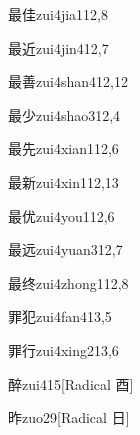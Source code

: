 \begin{entry}{最佳}{zui4jia1}{12,8}
\end{entry}

\begin{entry}{最近}{zui4jin4}{12,7}
\end{entry}

\begin{entry}{最善}{zui4shan4}{12,12}
\end{entry}

\begin{entry}{最少}{zui4shao3}{12,4}
\end{entry}

\begin{entry}{最先}{zui4xian1}{12,6}
\end{entry}

\begin{entry}{最新}{zui4xin1}{12,13}
\end{entry}

\begin{entry}{最优}{zui4you1}{12,6}
\end{entry}

\begin{entry}{最远}{zui4yuan3}{12,7}
\end{entry}

\begin{entry}{最终}{zui4zhong1}{12,8}
\end{entry}

\begin{entry}{罪犯}{zui4fan4}{13,5}
\end{entry}

\begin{entry}{罪行}{zui4xing2}{13,6}
\end{entry}

\begin{entry}{醉}{zui4}{15}[Radical 酉]
\end{entry}

\begin{entry}{昨}{zuo2}{9}[Radical 日]
\end{entry}

